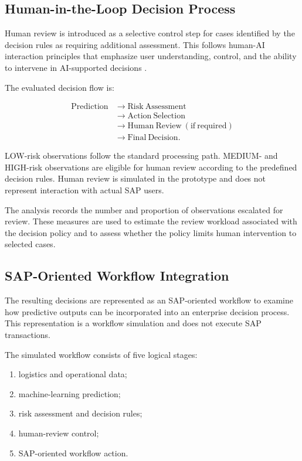\documentclass[10pt,a4paper]{article}
\begin{document}
\subsection{Human-in-the-Loop Decision Process}

Human review is introduced as a selective control step for cases
identified by the decision rules as requiring additional assessment.
This follows human-AI interaction principles that emphasize user
understanding, control, and the ability to intervene in AI-supported
decisions \cite{amershi2019guidelines,shneiderman2020human}.

The evaluated decision flow is:

\begin{equation}
\begin{aligned}
\mathrm{Prediction}
&\rightarrow \mathrm{Risk\ Assessment}\\
&\rightarrow \mathrm{Action\ Selection}\\
&\rightarrow \mathrm{Human\ Review\ (if\ required)}\\
&\rightarrow \mathrm{Final\ Decision}.
\end{aligned}
\end{equation}

LOW-risk observations follow the standard processing path. MEDIUM- and
HIGH-risk observations are eligible for human review according to the
predefined decision rules. Human review is simulated in the prototype
and does not represent interaction with actual SAP users.

The analysis records the number and proportion of observations
escalated for review. These measures are used to estimate the review
workload associated with the decision policy and to assess whether the
policy limits human intervention to selected cases.

\subsection{SAP-Oriented Workflow Integration}

The resulting decisions are represented as an SAP-oriented workflow to
examine how predictive outputs can be incorporated into an enterprise
decision process. This representation is a workflow simulation and
does not execute SAP transactions.

The simulated workflow consists of five logical stages:

\begin{enumerate}
\item logistics and operational data;
\item machine-learning prediction;
\item risk assessment and decision rules;
\item human-review control;
\item SAP-oriented workflow action.
\end{enumerate}
\end{document}
